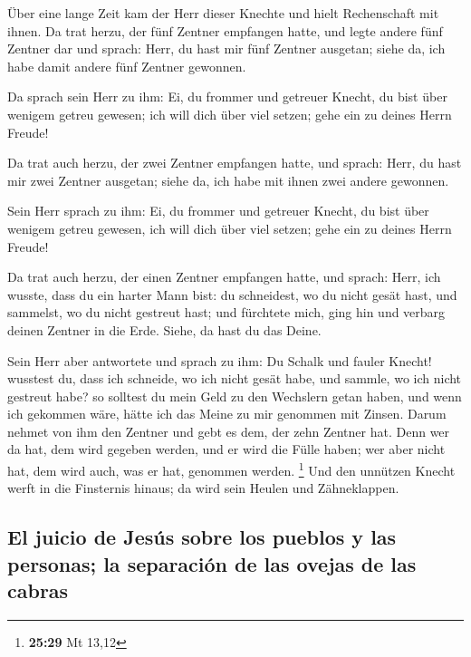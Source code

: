  Über eine lange Zeit kam der Herr dieser Knechte und
hielt Rechenschaft mit ihnen.  Da trat herzu, der fünf
Zentner empfangen hatte, und legte andere fünf Zentner dar und sprach:
Herr, du hast mir fünf Zentner ausgetan; siehe da, ich habe damit andere
fünf Zentner gewonnen.

 Da sprach sein Herr zu ihm: Ei, du frommer und getreuer
Knecht, du bist über wenigem getreu gewesen; ich will dich über viel
setzen; gehe ein zu deines Herrn Freude!

 Da trat auch herzu, der zwei Zentner empfangen hatte,
und sprach: Herr, du hast mir zwei Zentner ausgetan; siehe da, ich habe
mit ihnen zwei andere gewonnen.

 Sein Herr sprach zu ihm: Ei, du frommer und getreuer
Knecht, du bist über wenigem getreu gewesen, ich will dich über viel
setzen; gehe ein zu deines Herrn Freude!

 Da trat auch herzu, der einen Zentner empfangen hatte,
und sprach: Herr, ich wusste, dass du ein harter Mann bist: du
schneidest, wo du nicht gesät hast, und sammelst, wo du nicht gestreut
hast;  und fürchtete mich, ging hin und verbarg deinen
Zentner in die Erde. Siehe, da hast du das Deine.

 Sein Herr aber antwortete und sprach zu ihm: Du Schalk
und fauler Knecht! wusstest du, dass ich schneide, wo ich nicht gesät
habe, und sammle, wo ich nicht gestreut habe?  so
solltest du mein Geld zu den Wechslern getan haben, und wenn ich
gekommen wäre, hätte ich das Meine zu mir genommen mit Zinsen.
 Darum nehmet von ihm den Zentner und gebt es dem, der
zehn Zentner hat.  Denn wer da hat, dem wird gegeben
werden, und er wird die Fülle haben; wer aber nicht hat, dem wird auch,
was er hat, genommen werden. \footnote{\textbf{25:29} Mt 13,12}
 Und den unnützen Knecht werft in die Finsternis hinaus;
da wird sein Heulen und Zähneklappen.

\hypertarget{el-juicio-de-jesuxfas-sobre-los-pueblos-y-las-personas-la-separaciuxf3n-de-las-ovejas-de-las-cabras}{%
\subsection{El juicio de Jesús sobre los pueblos y las personas; la
separación de las ovejas de las
cabras}\label{el-juicio-de-jesuxfas-sobre-los-pueblos-y-las-personas-la-separaciuxf3n-de-las-ovejas-de-las-cabras}}


